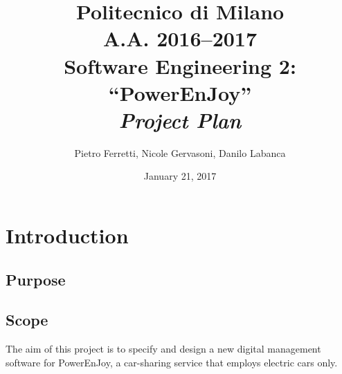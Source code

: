 \documentclass[english]{article}
\begin{document}
\title{Politecnico di Milano\\
 A.A. 2016–2017 \\
Software Engineering 2: “PowerEnJoy” \\
\emph{\textbf{Project Plan}}}

\author{Pietro Ferretti, Nicole Gervasoni, Danilo Labanca}
\date{January 21, 2017}
\maketitle

\newpage

\tableofcontents{}

\newpage

\section{Introduction}

\subsection{Purpose}
%

\subsection{Scope}
The aim of this project is to specify and design a new digital management software for PowerEnJoy, a car-sharing service that employs electric cars only.
\end{document}
